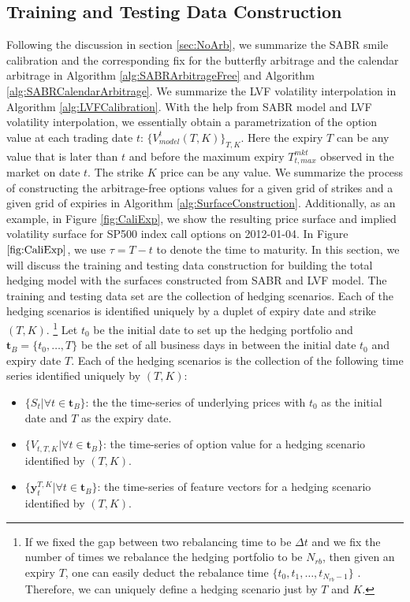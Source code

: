 \documentclass[letterpaper,12pt,titlepage,oneside,final]{book}
\numberwithin{equation}{section}
\theoremstyle{definition}
\newcommand{\vy}{\mathbf{y}}
\newcommand{\DT}{\Delta t}
\begin{document}
\subsection{Training and Testing Data Construction}
\label{sec:Augtrain}
Following the discussion in section \ref{sec:NoArb}, we summarize the SABR smile calibration and the corresponding fix for the butterfly arbitrage and the calendar arbitrage in Algorithm \ref{alg:SABRArbitrageFree} and Algorithm \ref{alg:SABRCalendarArbitrage}. We summarize the LVF volatility interpolation in Algorithm \ref{alg:LVFCalibration}. With the help from SABR model and LVF volatility interpolation, we essentially obtain a parametrization of the option value at each trading date $t$: $\{V^{t}_{model}(T,K)\}_{T,K}$. Here the expiry $T$  can be any value that is later than $t$ and before  the maximum expiry $T_{t,max}^{mkt}$ observed in the market on date $t$. The strike $K$ price can be any  value. We summarize the process of constructing the arbitrage-free options values for a given grid of strikes and a given grid of expiries in Algorithm \ref{alg:SurfaceConstruction}. Additionally, as an example, in Figure \ref{fig:CaliExp}, we show the resulting price surface and implied  volatility surface for SP500 index call options  on 2012-01-04. In Figure $\ref{fig:CaliExp}$, we use $\tau=T-t$ to denote the time to maturity.  
In this section, we will discuss the training and testing data construction for building the total hedging model with the surfaces constructed from SABR and LVF model. The training and testing data set are the collection of hedging scenarios. Each of the hedging scenarios is identified uniquely by a duplet of expiry date and strike  $(T,K)$. \footnote{ If we fixed the gap between two rebalancing time to be $\DT$ and we fix the number of times we rebalance the hedging portfolio to be $N_{rb}$, then given an expiry $T$, one can easily deduct the rebalance time $\{t_0,t_1, \dots, t_{N_{rb}-1}\}$ . Therefore, we can uniquely define a hedging scenario just by $T$ and $K$.} Let $t_0$ be the initial date to set up the hedging portfolio and $\mathbf{t}_B=\{t_0,\dots,T\}$ be the set of all business days in between the initial date $t_0$ and expiry date $T$.  Each of the hedging scenarios is the collection of the following time series identified uniquely by $(T,K)$:
\begin{itemize}
	\item $\{S_t|\forall t \in \mathbf{t}_B \}$: the the time-series of underlying prices  with $t_0$ as the initial date and $T$ as the expiry date.
	\item $\{V_{t,T,K}|\forall t \in \mathbf{t}_B\}$:  the time-series of option value for a hedging scenario identified by $(T,K)$.
	\item $\{\vy^{T,K}_{t}|\forall t \in \mathbf{t}_B\}$: the time-series of feature vectors for a hedging scenario identified by $(T,K)$.
\end{itemize}
\end{document}
